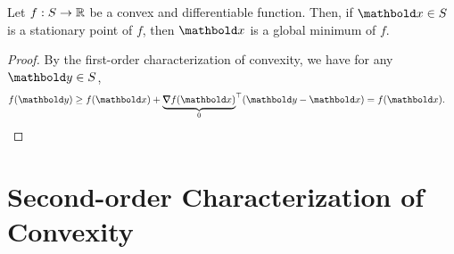 \begin{thm} Let $f: S \to \mathbb{R}$ be a convex and differentiable function. Then, if $\vx \in \sS$ is a stationary point of $f$, then $\vx$ is a global minimum of $f$.
\end{thm}
\begin{proof} By the first-order characterization of convexity, we have for any $\vy \in \sS$, \begin{align*}
    f(\vy) \geq f(\vx) + \trans{\underbrace{\grad f(\vx)}_{0}}(\vy - \vx) = f(\vx). &\qedhere
\end{align*}
\end{proof}

\section{Second-order Characterization of Convexity}